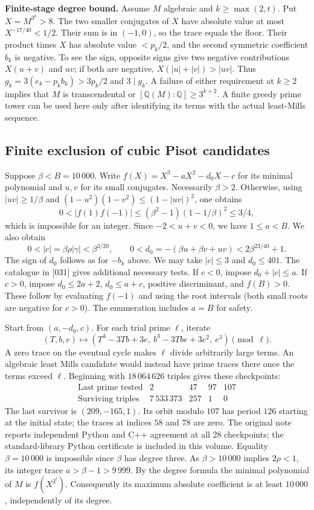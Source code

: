 \documentclass[11pt,a4paper,oneside,openany]{book}
\begin{document}
\textbf{Finite-stage degree bound.} Assume $M$ algebraic and $k\ge\max(2,t)$. Put $X=M^{3^k}>8$. The two smaller conjugates of $X$ have absolute value at most $X^{-17/40}<1/2$. Their sum is in $(-1,0)$, so the trace equals the floor. Their product times $X$ has absolute value $<p_k/2$, and the second symmetric coefficient $b_k$ is negative. To see the sign, opposite signs give two negative contributions $X(u+v)$ and $uv$; if both are negative, $X(|u|+|v|)>|uv|$. Thus $g_k=3(e_k-p_k b_k)>3p_k/2$ and $3\mid g_k$. A failure of either requirement at $k\ge2$ implies that $M$ is transcendental or $[\mathbb Q(M):\mathbb Q]\ge3^{k+2}$. A finite greedy prime tower can be used here only after identifying its terms with the actual least-Mills sequence.

\subsection*{Finite exclusion of cubic Pisot candidates}
Suppose $\beta<B=10\,000$. Write $f(X)=X^3-aX^2-d_0X-c$ for its minimal polynomial and $u,v$ for its small conjugates. Necessarily $\beta>2$. Otherwise, using $|uv|\ge1/\beta$ and $(1-u^2)(1-v^2)\le(1-|uv|)^2$, one obtains
\[
 0<|f(1)f(-1)|\le(\beta^2-1)(1-1/\beta)^2\le3/4,
\]
which is impossible for an integer. Since $-2<u+v<0$, we have $1\le a<B$. We also obtain
\[
 0<|c|=\beta\rho|\gamma|<\beta^{3/20},\qquad
 0<d_0=-(\beta u+\beta v+uv)<2\beta^{23/40}+1.
\]
The sign of $d_0$ follows as for $-b_k$ above. We may take $|c|\le3$ and $d_0\le401$. The catalogue in [031] gives additional necessary tests. If $c<0$, impose $d_0+|c|\le a$. If $c>0$, impose $d_0\le2a+2$, $d_0\le a+c$, positive discriminant, and $f(B)>0$. These follow by evaluating $f(-1)$ and using the root intervals (both small roots are negative for $c>0$). The enumeration includes $a=B$ for safety.

Start from $(a,-d_0,c)$. For each trial prime $\ell$, iterate
\[
 (T,b,e)\longmapsto(T^3-3Tb+3e,\ b^3-3Tbe+3e^2,\ e^3)\pmod\ell.
\]
A zero trace on the eventual cycle makes $\ell$ divide arbitrarily large terms. An algebraic least Mills candidate would instead have prime traces there once the terms exceed $\ell$. Beginning with $18\,064\,626$ triples gives these checkpoints:
\[
\begin{array}{c|rrrr}
\text{Last prime tested} &2&47&97&107\\\hline
\text{Surviving triples} &7\,533\,373&257&1&0
\end{array}
\]
The last survivor is $(209,-165,1)$. Its orbit modulo $107$ has period $126$ starting at the initial state; the traces at indices $58$ and $78$ are zero. The original note reports independent Python and C++ agreement at all 28 checkpoints; the standard-library Python certificate is included in this volume. Equality $\beta=10\,000$ is impossible since $\beta$ has degree three. As $\beta>10\,000$ implies $2\rho<1$, its integer trace $a>\beta-1>9\,999$. By the degree formula the minimal polynomial of $M$ is $f(X^{3^t})$. Consequently its maximum absolute coefficient is at least $10\,000$, independently of its degree.
\end{document}
